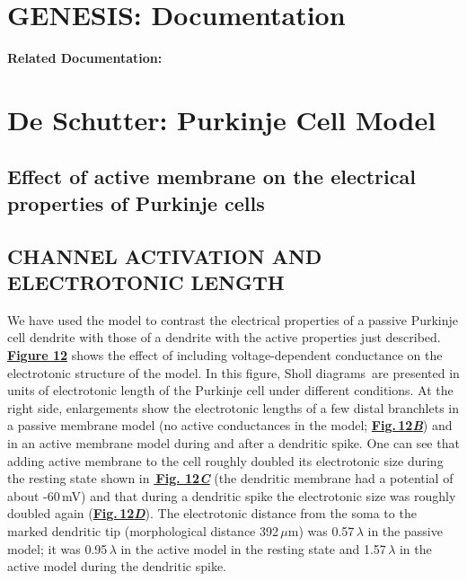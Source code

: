 \documentclass[12pt]{article}
\begin{document}
\section*{GENESIS: Documentation}

{\bf Related Documentation:}

\section*{De Schutter: Purkinje Cell Model}

\subsection*{Effect of active membrane on the electrical properties of Purkinje cells}

\subsection*{CHANNEL ACTIVATION AND ELECTROTONIC LENGTH}

We have used the model to contrast the electrical properties of a
passive Purkinje cell dendrite with those of a dendrite with
the active properties just described.
\href{../pub-purkinje-deschutter1-fig-12/pub-purkinje-deschutter1-fig-12.tex}{\bf Figure 12} shows the effect of including voltage-dependent
conductance on the electrotonic structure of the
model. In this figure, Sholl diagrams\,\cite{Sholl:1953kl} are presented
in units of electrotonic length of the Purkinje cell
under different conditions. At the right side, enlargements
show the electrotonic lengths of a few distal branchlets in a
passive membrane model (no active conductances in the
model; \href{../pub-purkinje-deschutter1-fig-12/pub-purkinje-deschutter1-fig-12.tex}{\bf Fig.\,12{\it B}}) and in an active membrane model during
and after a dendritic spike. One can see that adding active
membrane to the cell roughly doubled its electrotonic size
during the resting state shown in \href{../pub-purkinje-deschutter1-fig-12/pub-purkinje-deschutter1-fig-12.tex}{\bf\,Fig. 12{\it C}} (the dendritic
membrane had a potential of about -60\,mV) and that during
a dendritic spike the electrotonic size was roughly doubled
again (\href{../pub-purkinje-deschutter1-fig-12/pub-purkinje-deschutter1-fig-12.tex}{\bf Fig.\,12{\it D}}). The electrotonic distance from the
soma to the marked dendritic tip (morphological distance
392\,$\mu$m) was 0.57\,$\lambda$ in the passive model; it was 0.95\,$\lambda$ in the
active model in the resting state and 1.57\,$\lambda$ in the active
model during the dendritic spike.



\end{document}
